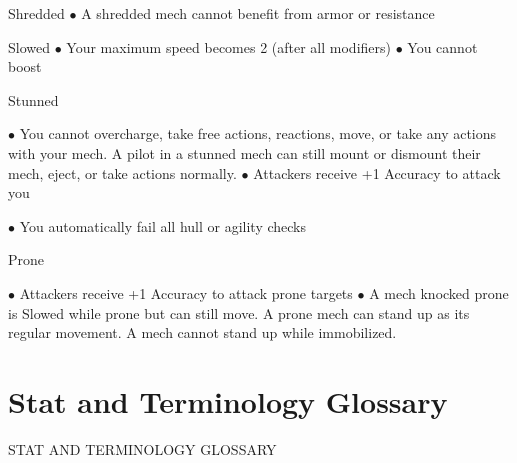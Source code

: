 Shredded  
    $\bullet$    A shredded mech cannot benefit from armor or resistance
 

                                                                                                          


Slowed  
     $\bullet$    Your maximum speed becomes 2 (after all modifiers)  
     $\bullet$    You cannot boost
 
Stunned 
 
     $\bullet$    You cannot overcharge, take free actions, reactions, move, or take any actions with your  
         mech. A pilot in a stunned mech can still mount or dismount their mech, eject, or take  
         actions normally.  
     $\bullet$    Attackers receive +1 Accuracy to attack you
 
     $\bullet$    You automatically fail all hull or agility checks
 
Prone 
 
     $\bullet$    Attackers receive +1 Accuracy to attack prone targets  
     $\bullet$    A mech knocked prone is Slowed while prone but can still move. A prone mech can stand  
         up as its regular movement. A mech cannot stand up while immobilized.  
\chapter{Stat and Terminology Glossary}
                          STAT AND TERMINOLOGY GLOSSARY  

